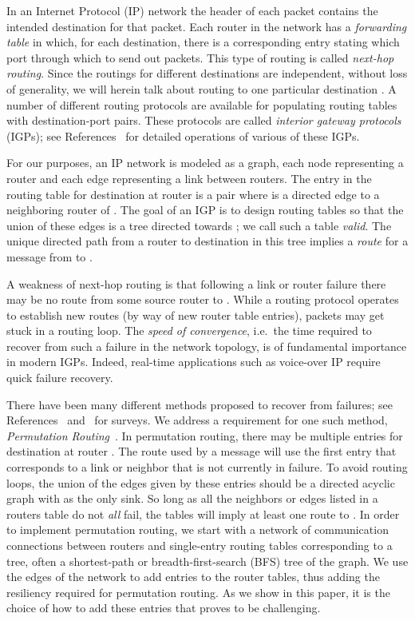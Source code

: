 \documentclass{article}
\begin{document}
In an Internet Protocol (IP) network the header of each packet
contains the intended destination for that packet.  Each router in the
network has a {\em forwarding table} in which, for each destination, there is a corresponding entry stating which port through which to send out packets.  This type of routing is called {\em next-hop routing}.
Since the routings for different destinations are independent, without
loss of generality, we will herein talk about routing to one particular
destination .  A number of different routing protocols are
available for populating routing tables with  destination-port
pairs.  These protocols are called {\em interior gateway protocols}
(IGPs); see References~\cite{rfc:1058,rfc:2178,rfc:1142} for detailed operations of various of these IGPs.


For our purposes, an IP network is modeled as a graph, each node
representing a router and each edge representing a link between
routers.  The entry in the routing table for destination  at router
 is a pair  where  is a directed edge to a neighboring
router  of .  The goal of an IGP is to design routing tables so
that the union of these edges is a tree directed towards ; we call such a table {\em valid}.  The unique directed path from a router  to destination  in this tree implies a {\em route} for a message from  to .

A weakness of next-hop routing is that following a link or router
failure there may be no route from some source router to .  While a
routing protocol operates to establish new routes (by way of new
router table entries), packets may get stuck in a routing loop.  The {\em speed of
  convergence}, i.e.~the time required to recover from such a failure in the
network topology, is of fundamental importance in modern IGPs.
Indeed, real-time applications such as voice-over IP require quick
failure recovery.  

There have been many different methods proposed to
recover from failures; see References~\cite{GSBCSHT12} and~\cite{RI07} for surveys.  
We address a requirement for one such method, {\em Permutation Routing}~\cite{VLK12}.  In permutation routing, there may be multiple entries for destination  at router .  The route used by a message will use the first entry that corresponds to a link or neighbor that is not currently in failure.  To avoid routing loops, the union of the edges given by these entries should be a directed acyclic graph with  as the only sink.   So long as all the neighbors or edges listed in a routers table do not {\em all} fail, the tables will imply at least one route to .  In order to implement permutation routing, we start with a network of communication connections between routers and single-entry routing tables corresponding to a tree, often a shortest-path or breadth-first-search (BFS) tree of the graph.  We use the edges of the network to add entries to the router tables, thus adding the resiliency required for permutation routing.  As we show in this paper, it is the choice of how to add these entries that proves to be challenging.
\end{document}
